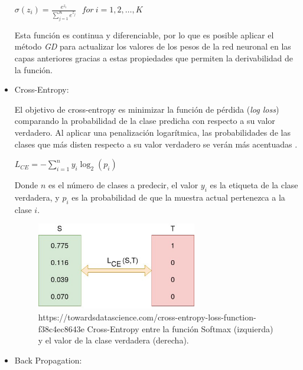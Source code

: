 \begin{itemize}
                    \begin{center}
                        $\sigma(z_i) = \frac{e^{z_{i}}}{\sum_{j=1}^K e^{z_{j}}} \ \ \ for\ i=1,2,\dots,K$
                    \end{center}


                    Esta función es continua y diferenciable, por lo que es posible aplicar el método \textit{GD} para actualizar los valores de los pesos de la red neuronal en las capas anteriores gracias a estas propiedades que permiten la derivabilidad de la función.


                \item Cross-Entropy:

                    El objetivo de cross-entropy es minimizar la función de pérdida (\textit{log loss}) comparando la probabilidad de la clase predicha con respecto a su valor verdadero. Al aplicar una penalización logarítmica, las probabilidades de las clases que más disten respecto a su valor verdadero se verán más acentuadas \cite{Cross-Entropy}.

                    \begin{center}
                        $L_{CE} = -\sum_{i = 1}^n y_i \log_2(p_i)$
                    \end{center}

                    Donde $n$ es el número de clases a predecir, el valor $y_i$ es la etiqueta de la clase verdadera, y $p_i$ es la probabilidad de que la muestra actual pertenezca a la clase $i$.

                    \begin{figure}[h]
                        \centering
                        \includegraphics[width=7cm]{archivos/CNN/CrossEntropy}
                        \caption{https://towardsdatascience.com/cross-entropy-loss-function-f38c4ec8643e Cross-Entropy entre la función Softmax (izquierda) y el valor de la clase verdadera (derecha).}
                        \label{CrossEntropyImage}
                     \end{figure}

                \item Back Propagation:


\end{itemize}
